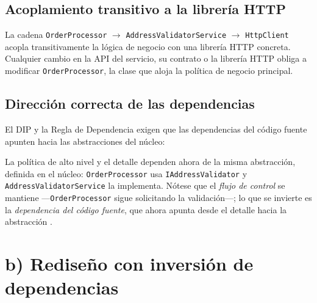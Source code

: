 \subsection*{Acoplamiento transitivo a la librería HTTP}

La cadena \texttt{OrderProcessor} $\rightarrow$ \texttt{AddressValidatorService} $\rightarrow$ \texttt{HttpClient} acopla transitivamente la lógica de negocio con una librería HTTP concreta. Cualquier cambio en la API del servicio, su contrato o la librería HTTP obliga a modificar \texttt{OrderProcessor}, la clase que aloja la política de negocio principal.

\subsection*{Dirección correcta de las dependencias}

El DIP y la Regla de Dependencia exigen que las dependencias del código fuente apunten hacia las abstracciones del núcleo:

\begin{center}
\end{center}

La política de alto nivel y el detalle dependen ahora de la misma abstracción, definida en el núcleo: \texttt{OrderProcessor} usa \texttt{IAddressValidator} y \texttt{AddressValidatorService} la implementa. Nótese que el \textit{flujo de control} se mantiene —\texttt{OrderProcessor} sigue solicitando la validación—; lo que se invierte es la \textit{dependencia del código fuente}, que ahora apunta desde el detalle hacia la abstracción .

\section{b) Rediseño con inversión de dependencias}

